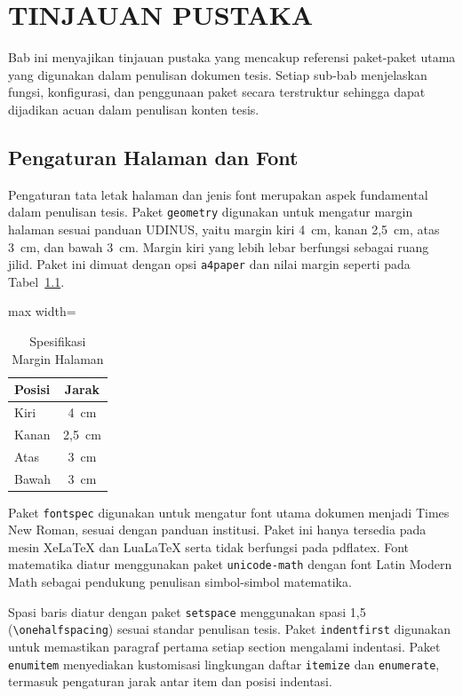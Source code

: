 \chapter{TINJAUAN PUSTAKA}

Bab ini menyajikan tinjauan pustaka yang mencakup referensi paket-paket utama yang digunakan dalam penulisan dokumen tesis. Setiap sub-bab menjelaskan fungsi, konfigurasi, dan penggunaan paket secara terstruktur sehingga dapat dijadikan acuan dalam penulisan konten tesis.

\section{Pengaturan Halaman dan Font}

Pengaturan tata letak halaman dan jenis font merupakan aspek fundamental dalam penulisan tesis. Paket \texttt{geometry} digunakan untuk mengatur margin halaman sesuai panduan UDINUS, yaitu margin kiri 4~cm, kanan 2,5~cm, atas 3~cm, dan bawah 3~cm. Margin kiri yang lebih lebar berfungsi sebagai ruang jilid. Paket ini dimuat dengan opsi \texttt{a4paper} dan nilai margin seperti pada Tabel~\ref{tab:margin}.

\begin{table}[h]
  \centering
  \caption{Spesifikasi Margin Halaman}
  \label{tab:margin}
  \begin{adjustbox}{max width=\textwidth}
  \begin{tabular}{lc}
    \toprule
    \textbf{Posisi} & \textbf{Jarak} \\
    \midrule
    Kiri & 4~cm \\
    Kanan & 2,5~cm \\
    Atas & 3~cm \\
    Bawah & 3~cm \\
    \bottomrule
  \end{tabular}
  \end{adjustbox}
\end{table}

Paket \texttt{fontspec} digunakan untuk mengatur font utama dokumen menjadi Times New Roman, sesuai dengan panduan institusi. Paket ini hanya tersedia pada mesin XeLaTeX dan LuaLaTeX serta tidak berfungsi pada pdflatex. Font matematika diatur menggunakan paket \texttt{unicode-math} dengan font Latin Modern Math sebagai pendukung penulisan simbol-simbol matematika.

Spasi baris diatur dengan paket \texttt{setspace} menggunakan spasi 1,5 (\texttt{\textbackslash onehalfspacing}) sesuai standar penulisan tesis. Paket \texttt{indentfirst} digunakan untuk memastikan paragraf pertama setiap section mengalami indentasi. Paket \texttt{enumitem} menyediakan kustomisasi lingkungan daftar \texttt{itemize} dan \texttt{enumerate}, termasuk pengaturan jarak antar item dan posisi indentasi.

